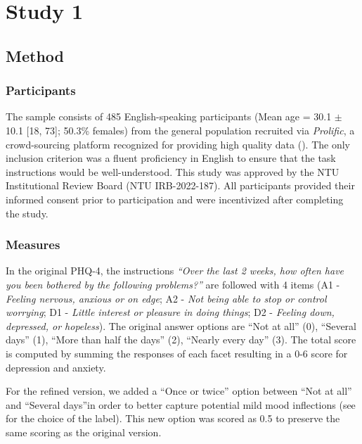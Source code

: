 \documentclass[
  jou,
  floatsintext,
  longtable,
  nolmodern,
  notxfonts,
  notimes,
  colorlinks=true,linkcolor=blue,citecolor=blue,urlcolor=blue]{apa7}
\begin{document}
\section{Study 1}\label{study-1}

\subsection{Method}\label{method}

\subsubsection{Participants}\label{participants}

The sample consists of 485 English-speaking participants (Mean age =
30.1 \(\pm\) 10.1 {[}18, 73{]}; 50.3\% females) from the general
population recruited via \emph{Prolific}, a crowd-sourcing platform
recognized for providing high quality data
(). The only inclusion
criterion was a fluent proficiency in English to ensure that the task
instructions would be well-understood. This study was approved by the
NTU Institutional Review Board (NTU IRB-2022-187). All participants
provided their informed consent prior to participation and were
incentivized after completing the study.

\subsubsection{Measures}\label{measures}

In the original PHQ-4, the instructions \emph{``Over the last 2 weeks,
how often have you been bothered by the following problems?''} are
followed with 4 items (A1 - \emph{Feeling nervous, anxious or on edge};
A2 - \emph{Not being able to stop or control worrying}; D1 -
\emph{Little interest or pleasure in doing things}; D2 - \emph{Feeling
down, depressed, or hopeless}). The original answer options are ``Not at
all'' (0), ``Several days'' (1), ``More than half the days'' (2),
``Nearly every day'' (3). The total score is computed by summing the
responses of each facet resulting in a 0-6 score for depression and
anxiety.

For the refined version, we added a ``Once or twice'' option between
``Not at all'' and ``Several days''in order to better capture potential
mild mood inflections (see  for the choice of the label). This new option was
scored as 0.5 to preserve the same scoring as the original version.
\end{document}

